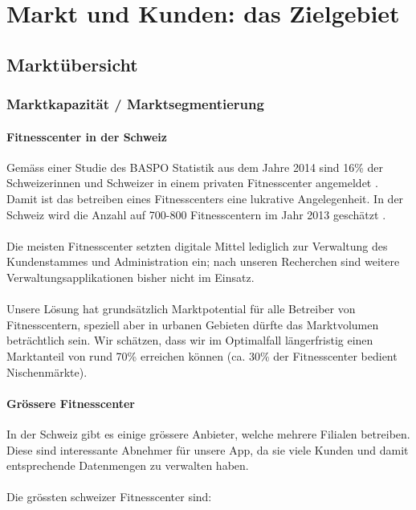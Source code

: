 \clearpage
\section{Markt und Kunden: das Zielgebiet}

\subsection{Marktübersicht}

\subsubsection{Marktkapazität / Marktsegmentierung}\label{sec:marktkapazitat}

\paragraph{Fitnesscenter in der Schweiz}
Gemäss einer Studie des BASPO Statistik aus dem Jahre 2014 sind 16\% der Schweizerinnen und Schweizer in einem privaten Fitnesscenter angemeldet \cite{schweizer+fitness}. Damit ist das betreiben eines Fitnesscenters eine lukrative Angelegenheit. In der Schweiz wird die Anzahl auf 700-800 Fitnesscentern im Jahr 2013 geschätzt \cite{fitness-studios+1+milliarde}\cite{fitness+tribune}. \\ \\
Die meisten Fitnesscenter setzten digitale Mittel lediglich zur Verwaltung des Kundenstammes und Administration ein; nach unseren Recherchen sind weitere Verwaltungsapplikationen bisher nicht im Einsatz. \\ \\
Unsere Lösung hat grundsätzlich Marktpotential für alle Betreiber von Fitnesscentern, speziell aber in urbanen Gebieten dürfte das Marktvolumen beträchtlich sein. Wir schätzen, dass wir im Optimalfall längerfristig einen Marktanteil von rund 70\% erreichen können (ca. 30\% der Fitnesscenter bedient Nischenmärkte).

\paragraph{Grössere Fitnesscenter}
In der Schweiz gibt es einige grössere Anbieter, welche mehrere Filialen betreiben. Diese sind interessante Abnehmer für unsere App, da sie viele Kunden und damit entsprechende Datenmengen zu verwalten haben.
\\ \\
Die grössten schweizer Fitnesscenter sind\cite{fitness+tribune}:

